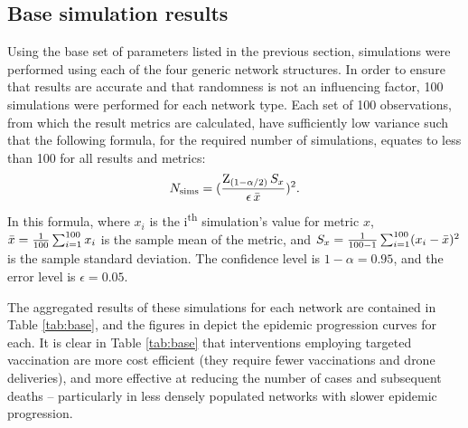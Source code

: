 \documentclass[10pt,letterpaper]{article}
\begin{document}
\subsection*{Base simulation results}
Using the base set of parameters listed in the previous section, simulations were performed using each of the four generic network structures. In order to ensure that results are accurate and that randomness is not an influencing factor, 100 simulations were performed for each network type. Each set of 100 observations, from which the result metrics are calculated, have sufficiently low variance such that the following formula, for the required number of simulations, equates to less than 100 for all results and metrics: 
$$N_{\text{sims}} = (\frac{\text{Z}_{(1-\alpha/2)} \, S_{x}}{\epsilon \, \Bar{x}})^{2}.$$
In this formula, where $x_{i}$ is the i\textsuperscript{th} simulation's value for metric $x$, $\Bar{x} = \frac{1}{100} \sum^{100}_{i=1} x_{i}$ is the sample mean of the metric, and $S_{x} = \frac{1}{100-1} \sum^{100}_{i=1} (x_{i} - \Bar{x})^{2}$ is the sample standard deviation. The confidence level is $1 - \alpha = 0.95$, and the error level is $\epsilon = 0.05$.

The aggregated results of these simulations for each network are contained in Table \ref{tab:base}, and the figures in  depict the epidemic progression curves for each. It is clear in Table \ref{tab:base} that interventions employing targeted vaccination are more cost efficient (they require fewer vaccinations and drone deliveries), and more effective at reducing the number of cases and subsequent deaths -- particularly in less densely populated networks with slower epidemic progression. 
\end{document}
